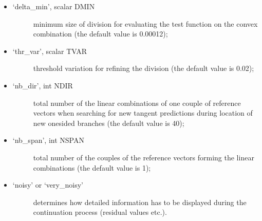 \documentclass[a4paper,11pt,english]{sphinxmanual}
\begin{document}
\begin{fulllineitems}
\begin{itemize}
\begin{itemize}
\begin{description}
\end{description}

\item {} \begin{description}
\item[{‘delta\_min’, scalar DMIN}] \leavevmode
minimum size of division for evaluating the test function on the
convex combination (the default value is 0.00012);

\end{description}

\item {} \begin{description}
\item[{‘thr\_var’, scalar TVAR}] \leavevmode
threshold variation for refining the division (the default value is
0.02);

\end{description}

\item {} \begin{description}
\item[{‘nb\_dir’, int NDIR}] \leavevmode
total number of the linear combinations of one couple of reference
vectors when searching for new tangent predictions during location of
new one\sphinxhyphen{}sided branches (the default value is 40);

\end{description}

\item {} \begin{description}
\item[{‘nb\_span’, int NSPAN}] \leavevmode
total number of the couples of the reference vectors forming the
linear combinations (the default value is 1);

\end{description}

\item {} \begin{description}
\item[{‘noisy’ or ‘very\_noisy’}] \leavevmode
determines how detailed information has to be displayed during the
continuation process (residual values etc.).

\end{description}

\end{itemize}

\end{itemize}


\end{fulllineitems}
\end{document}

